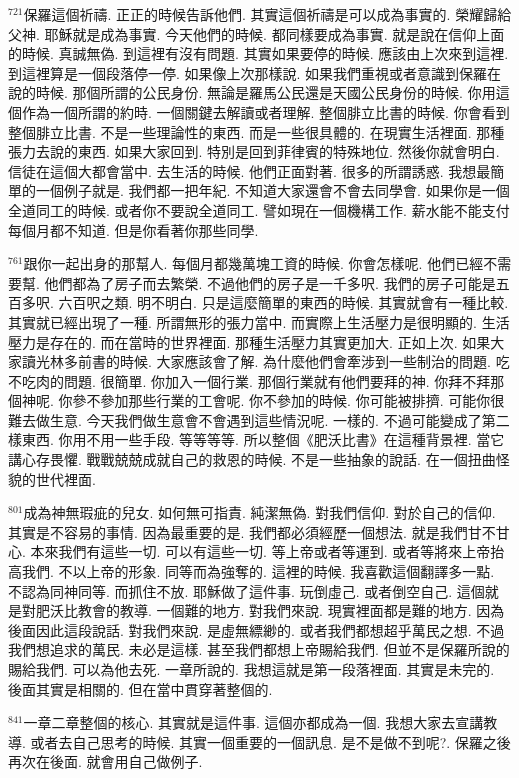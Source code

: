 \documentclass{book}
\begin{document}
$^{721}$保羅這個祈禱.
正正的時候告訴他們.
其實這個祈禱是可以成為事實的.
榮耀歸給父神.
耶穌就是成為事實.
今天他們的時候.
都同樣要成為事實.
就是說在信仰上面的時候.
真誠無偽.
到這裡有沒有問題.
其實如果要停的時候.
應該由上次來到這裡.
到這裡算是一個段落停一停.
如果像上次那樣說.
如果我們重視或者意識到保羅在說的時候.
那個所謂的公民身份.
無論是羅馬公民還是天國公民身份的時候.
你用這個作為一個所謂的約時.
一個關鍵去解讀或者理解.
整個腓立比書的時候.
你會看到整個腓立比書.
不是一些理論性的東西.
而是一些很具體的.
在現實生活裡面.
那種張力去說的東西.
如果大家回到.
特別是回到菲律賓的特殊地位.
然後你就會明白.
信徒在這個大都會當中.
去生活的時候.
他們正面對著.
很多的所謂誘惑.
我想最簡單的一個例子就是.
我們都一把年紀.
不知道大家還會不會去同學會.
如果你是一個全道同工的時候.
或者你不要說全道同工.
譬如現在一個機構工作.
薪水能不能支付每個月都不知道.
但是你看著你那些同學.

$^{761}$跟你一起出身的那幫人.
每個月都幾萬塊工資的時候.
你會怎樣呢.
他們已經不需要幫.
他們都為了房子而去繁榮.
不過他們的房子是一千多呎.
我們的房子可能是五百多呎.
六百呎之類.
明不明白.
只是這麼簡單的東西的時候.
其實就會有一種比較.
其實就已經出現了一種.
所謂無形的張力當中.
而實際上生活壓力是很明顯的.
生活壓力是存在的.
而在當時的世界裡面.
那種生活壓力其實更加大.
正如上次.
如果大家讀光林多前書的時候.
大家應該會了解.
為什麼他們會牽涉到一些制治的問題.
吃不吃肉的問題.
很簡單.
你加入一個行業.
那個行業就有他們要拜的神.
你拜不拜那個神呢.
你參不參加那些行業的工會呢.
你不參加的時候.
你可能被排擠.
可能你很難去做生意.
今天我們做生意會不會遇到這些情況呢.
一樣的.
不過可能變成了第二樣東西.
你用不用一些手段.
等等等等.
所以整個《肥沃比書》在這種背景裡.
當它講心存畏懼.
戰戰兢兢成就自己的救恩的時候.
不是一些抽象的說話.
在一個扭曲怪貌的世代裡面.

$^{801}$成為神無瑕疵的兒女.
如何無可指責.
純潔無偽.
對我們信仰.
對於自己的信仰.
其實是不容易的事情.
因為最重要的是.
我們都必須經歷一個想法.
就是我們甘不甘心.
本來我們有這些一切.
可以有這些一切.
等上帝或者等運到.
或者等將來上帝抬高我們.
不以上帝的形象.
同等而為強奪的.
這裡的時候.
我喜歡這個翻譯多一點.
不認為同神同等.
而抓住不放.
耶穌做了這件事.
玩倒虛己.
或者倒空自己.
這個就是對肥沃比教會的教導.
一個難的地方.
對我們來說.
現實裡面都是難的地方.
因為後面因此這段說話.
對我們來說.
是虛無縹緲的.
或者我們都想超乎萬民之想.
不過我們想追求的萬民.
未必是這樣.
甚至我們都想上帝賜給我們.
但並不是保羅所說的賜給我們.
可以為他去死.
一章所說的.
我想這就是第一段落裡面.
其實是未完的.
後面其實是相關的.
但在當中貫穿著整個的.

$^{841}$一章二章整個的核心.
其實就是這件事.
這個亦都成為一個.
我想大家去宣講教導.
或者去自己思考的時候.
其實一個重要的一個訊息.
是不是做不到呢?.
保羅之後再次在後面.
就會用自己做例子.
\newpage
\end{document}
